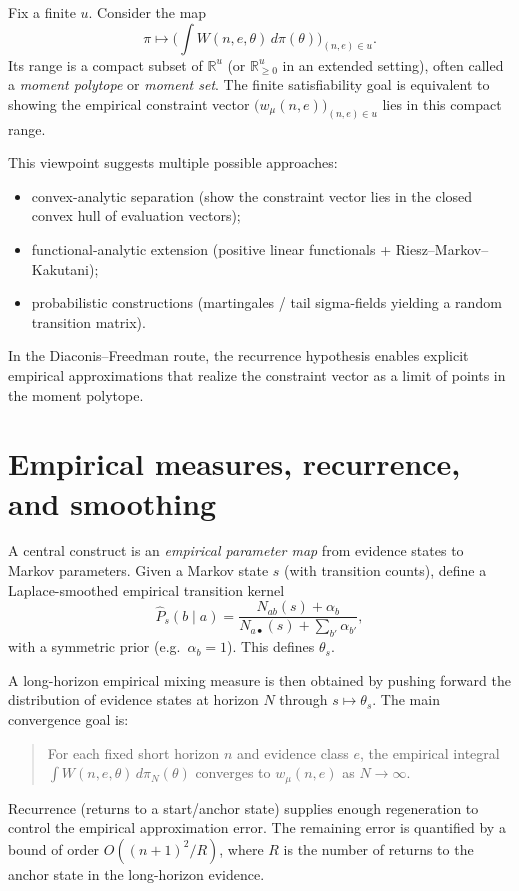 \documentclass[11pt]{article}
\newcommand{\RR}{\mathbb{R}}
\begin{document}
Fix a finite $u$. Consider the map
\[
\pi \longmapsto \Big( \int W(n,e,\theta)\,d\pi(\theta)\Big)_{(n,e)\in u}.
\]
Its range is a compact subset of $\RR^{u}$ (or $\mathbb{R}_{\ge 0}^u$ in an extended setting),
often called a \emph{moment polytope} or \emph{moment set}. The finite satisfiability goal is
equivalent to showing the empirical constraint vector
$\big(w_\mu(n,e)\big)_{(n,e)\in u}$ lies in this compact range.

This viewpoint suggests multiple possible approaches:
\begin{itemize}
\item convex-analytic separation (show the constraint vector lies in the closed convex hull of
evaluation vectors);
\item functional-analytic extension (positive linear functionals + Riesz--Markov--Kakutani);
\item probabilistic constructions (martingales / tail sigma-fields yielding a random transition
matrix).
\end{itemize}
In the Diaconis--Freedman route, the recurrence hypothesis enables explicit empirical
approximations that realize the constraint vector as a limit of points in the moment polytope.

\section{Empirical measures, recurrence, and smoothing}

A central construct is an \emph{empirical parameter map} from evidence states to Markov parameters.
Given a Markov state $s$ (with transition counts), define a Laplace-smoothed empirical transition
kernel
\[
\widehat{P}_s(b\mid a)=\frac{N_{ab}(s)+\alpha_b}{N_{a\bullet}(s)+\sum_{b'}\alpha_{b'}},
\]
with a symmetric prior (e.g.\ $\alpha_b=1$). This defines $\theta_s$.

A long-horizon empirical mixing measure is then obtained by pushing forward the distribution of
evidence states at horizon $N$ through $s\mapsto \theta_s$.
The main convergence goal is:

\begin{quote}
For each fixed short horizon $n$ and evidence class $e$, the empirical integral
$\int W(n,e,\theta)\,d\pi_N(\theta)$ converges to $w_\mu(n,e)$ as $N\to\infty$.
\end{quote}

Recurrence (returns to a start/anchor state) supplies enough regeneration to control the empirical
approximation error. The remaining error is quantified by a bound of order
$O((n+1)^2/R)$, where $R$ is the number of returns to the anchor state in the long-horizon evidence.
\end{document}
